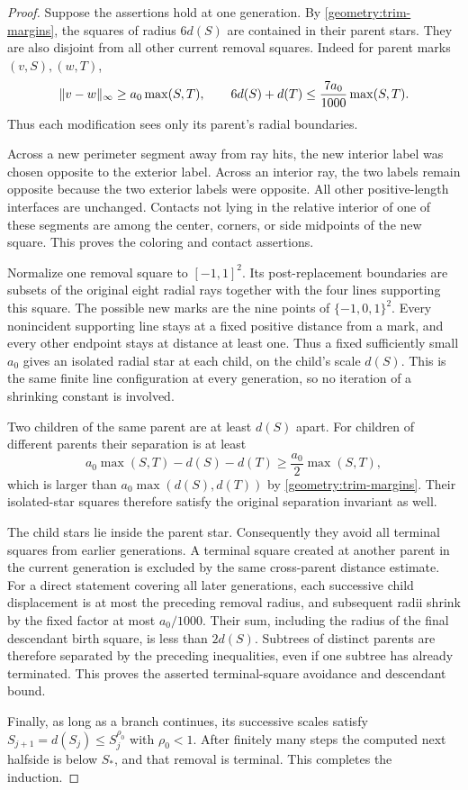 \begin{proof}
Suppose the assertions hold at one generation.  By
\eqref{geometry:trim-margins}, the squares of radius $6d(S)$ are contained
in their parent stars.  They are also disjoint from all other current
removal squares.  Indeed for parent marks $(v,S),(w,T)$,
\[
 \lVert v-w\rVert_\infty\ge a_0\max(S,T),\qquad
 6d(S)+d(T)\le \frac{7a_0}{1000}\max(S,T).
\]
Thus each modification sees only its parent's radial boundaries.

Across a new perimeter segment away from ray hits, the new interior
label was chosen opposite to the exterior label.  Across an interior
ray, the two labels remain opposite because the two exterior labels were
opposite.  All other positive-length interfaces are unchanged.  Contacts
not lying in the relative interior of one of these segments are among
the center, corners, or side midpoints of the new square.  This proves the
coloring and contact assertions.

Normalize one removal square to $[-1,1]^2$.  Its post-replacement
boundaries are subsets of the original eight radial rays together with
the four lines supporting this square.  The possible new marks are the
nine points of $\{-1,0,1\}^2$.  Every nonincident supporting line stays at
a fixed positive distance from a mark, and every other endpoint stays
at distance at least one.  Thus a fixed sufficiently small $a_0$ gives
an isolated radial star at each child, on the child's scale $d(S)$.
This is the same finite line configuration at every generation, so no
iteration of a shrinking constant is involved.

Two children of the same parent are at least $d(S)$ apart.  For children
of different parents their separation is at least
\[
 a_0\max(S,T)-d(S)-d(T)
 \ge \frac{a_0}{2}\max(S,T),
\]
which is larger than $a_0\max(d(S),d(T))$ by
\eqref{geometry:trim-margins}.  Their isolated-star squares therefore
satisfy the original separation invariant as well.

The child stars lie inside the parent star.  Consequently they avoid
all terminal squares from earlier generations.  A terminal square
created at another parent in the current generation is excluded by the
same cross-parent distance estimate.  For a direct statement covering
all later generations, each successive child displacement is at most
the preceding removal radius, and subsequent radii shrink by the fixed
factor at most $a_0/1000$.  Their sum, including the radius of the final descendant birth square,
is less than $2d(S)$.  Subtrees of distinct parents are therefore
separated by the preceding inequalities,
even if one subtree has already terminated.  This proves the asserted
terminal-square avoidance and descendant bound.

Finally, as long as a branch continues, its successive scales satisfy
$S_{j+1}=d(S_j)\le S_j^{\rho_0}$ with $\rho_0<1$.  After finitely many
steps the computed next halfside is below $S_*$, and that removal is
terminal.  This
completes the induction.
\end{proof}

